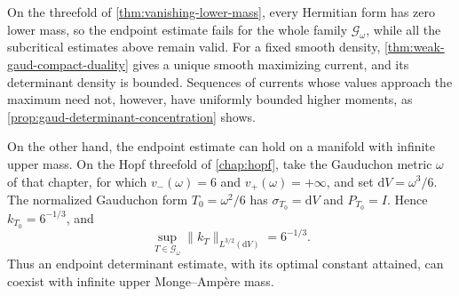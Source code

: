 On the threefold of \cref{thm:vanishing-lower-mass}, every Hermitian form has zero lower mass, so the endpoint estimate fails for the whole family $\mathscr G_\omega$, while all the subcritical estimates above remain valid. For a fixed smooth density, \cref{thm:weak-gaud-compact-duality} gives a unique smooth maximizing current, and its determinant density is bounded. Sequences of currents whose values approach the maximum need not, however, have uniformly bounded higher moments, as \cref{prop:gaud-determinant-concentration} shows.

On the other hand, the endpoint estimate can hold on a manifold with infinite upper mass. On the Hopf threefold of \cref{chap:hopf}, take the Gauduchon metric $\omega$ of that chapter, for which $v_-(\omega)=6$ and $v_+(\omega)=+\infty$, and set $\mathrm{d}V=\omega^3/6$. The normalized Gauduchon form $T_0=\omega^2/6$ has $\sigma_{T_0}=\mathrm{d}V$ and $P_{T_0}=I$. Hence $k_{T_0}=6^{-1/3}$, and
\[
 \sup_{T\in\mathscr G_\omega}\|k_T\|_{L^{3/2}(\mathrm{d}V)}=6^{-1/3}.
\]
Thus an endpoint determinant estimate, with its optimal constant attained, can coexist with infinite upper Monge--Amp\`ere mass.




